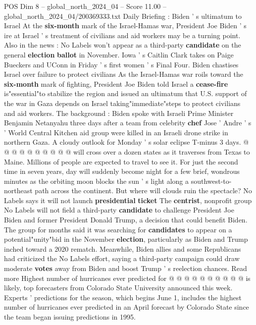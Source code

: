 \begin{textsample}{POS Dim 8 – global\_north\_2024\_04 – Score 11.00 – global\_north\_2024\_04/200369333.txt}  \label{ex:f8_pos_060}
Daily Briefing : Biden ' s ultimatum to Israel At the \textbf{six-month} mark of the Israel-Hamas war, President Joe Biden ' s ire at Israel ' s treatment of civilians and aid workers may be a turning point.
Also in the news : No Labels won't appear as a third-party \textbf{candidate} on the general \textbf{election} \textbf{ballot} in November.
Iowa ' s Caitlin Clark takes on Paige Bueckers and UConn in Friday ' s first women ' s Final Four.
Biden chastises Israel over failure to protect civilians As the Israel-Hamas war roils toward the \textbf{six-month} mark of fighting, President Joe Biden told Israel a \textbf{cease-fire} is"essential"to stabilize the region and issued an ultimatum that U.S. support of the war in Gaza depends on Israel taking"immediate"steps to protect civilians and aid workers.
The background : Biden spoke with Israeli Prime Minister Benjamin Netanyahu three days after a team from celebrity \textbf{chef} Jose ' Andre ' s ' World Central Kitchen aid group were killed in an Israeli drone strike in northern Gaza.
A cloudy outlook for Monday ' s solar eclipse T-minus 3 days. @ @ @ @ @ @ @ @ @ @ will cross over a dozen states as it traverses from Texas to Maine.
Millions of people are expected to travel to see it.
For just the second time in seven years, day will suddenly become night for a few brief, wondrous minutes as the orbiting moon blocks the sun ' s light along a southwest-to-northeast path across the continent.
But where will clouds ruin the spectacle?
No Labels says it will not launch \textbf{presidential} \textbf{ticket} The \textbf{centrist}, nonprofit group No Labels will not field a third-party \textbf{candidate} to challenge President Joe Biden and former President Donald Trump, a decision that could benefit Biden.
The group for months said it was searching for \textbf{candidates} to appear on a potential"unity"bid in the November \textbf{election}, particularly as Biden and Trump inched toward a 2020 rematch.
Meanwhile, Biden allies and some Republicans had criticized the No Labels effort, saying a third-party campaign could draw moderate \textbf{votes} away from Biden and boost Trump ' s reelection chances.
Read more Highest number of hurricanes ever predicted for @ @ @ @ @ @ @ @ @ @ is likely, top forecasters from Colorado State University announced this week.
Experts ' predictions for the season, which begins June 1, includes the highest number of hurricanes ever predicted in an April forecast by Colorado State since the team began issuing predictions in 1995.

\end{textsample}
